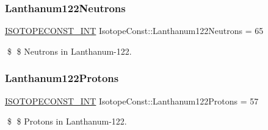 \subsubsection{\texorpdfstring{Lanthanum122\+Neutrons}{Lanthanum122Neutrons}}
{\footnotesize\ttfamily \mbox{\hyperlink{group___isotope_const-_macros_ga5f18360b3e99483a35c32d789e62621c}{I\+S\+O\+T\+O\+P\+E\+C\+O\+N\+S\+T\+\_\+\+I\+NT}} Isotope\+Const\+::\+Lanthanum122\+Neutrons = 65}

\$ \$ Neutrons in Lanthanum-\/122. \mbox{\label{group___isotope_const-_lanthanum-_la122_gaa32d62e9ffd255150c2688f986f4f802}} 
\subsubsection{\texorpdfstring{Lanthanum122\+Protons}{Lanthanum122Protons}}
{\footnotesize\ttfamily \mbox{\hyperlink{group___isotope_const-_macros_ga5f18360b3e99483a35c32d789e62621c}{I\+S\+O\+T\+O\+P\+E\+C\+O\+N\+S\+T\+\_\+\+I\+NT}} Isotope\+Const\+::\+Lanthanum122\+Protons = 57}

\$ \$ Protons in Lanthanum-\/122. 